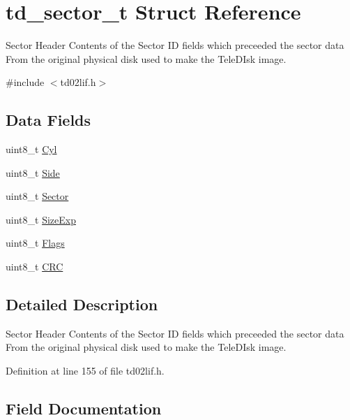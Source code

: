 \hypertarget{structtd__sector__t}{}\section{td\+\_\+sector\+\_\+t Struct Reference}
\label{structtd__sector__t}


Sector Header Contents of the Sector ID fields which preceeded the sector data From the original physical disk used to make the Tele\+D\+Isk image.  




{\ttfamily \#include $<$td02lif.\+h$>$}

\subsection*{Data Fields}
\begin{DoxyCompactItemize}
\item 
uint8\+\_\+t \hyperlink{structtd__sector__t_afddd9f1e3a41cc6e3a9be2478cd3305b}{Cyl}
\item 
uint8\+\_\+t \hyperlink{structtd__sector__t_ae8f05b8d6e903e618f6adec8973221f7}{Side}
\item 
uint8\+\_\+t \hyperlink{structtd__sector__t_a703252220f745cd6adfedadd5cc993d6}{Sector}
\item 
uint8\+\_\+t \hyperlink{structtd__sector__t_addc6d434740a76aebde544a9beab1b6b}{Size\+Exp}
\item 
uint8\+\_\+t \hyperlink{structtd__sector__t_ad30cfc0c6589ff25f8456ada5b352efa}{Flags}
\item 
uint8\+\_\+t \hyperlink{structtd__sector__t_aaccfa1ee85151410b042457fc5b584e5}{C\+RC}
\end{DoxyCompactItemize}


\subsection{Detailed Description}
Sector Header Contents of the Sector ID fields which preceeded the sector data From the original physical disk used to make the Tele\+D\+Isk image. 

Definition at line 155 of file td02lif.\+h.



\subsection{Field Documentation}
